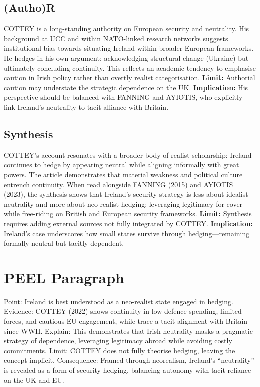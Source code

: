 \subsection*{(Autho)R}
COTTEY is a long-standing authority on European security and neutrality. His background at UCC and within NATO-linked research networks suggests institutional bias towards situating Ireland within broader European frameworks. He hedges in his own argument: acknowledging structural change (Ukraine) but ultimately concluding continuity. This reflects an academic tendency to emphasise caution in Irish policy rather than overtly realist categorisation.  
\textbf{Limit:} Authorial caution may understate the strategic dependence on the UK.  
\textbf{Implication:} His perspective should be balanced with FANNING and AYIOTIS, who explicitly link Ireland’s neutrality to tacit alliance with Britain.

\subsection*{Synthesis}
COTTEY’s account resonates with a broader body of realist scholarship: Ireland continues to hedge by appearing neutral while aligning informally with great powers. The article demonstrates that material weakness and political culture entrench continuity. When read alongside FANNING (2015) and AYIOTIS (2023), the synthesis shows that Ireland’s security strategy is less about idealist neutrality and more about neo-realist hedging: leveraging legitimacy for cover while free-riding on British and European security frameworks.  
\textbf{Limit:} Synthesis requires adding external sources not fully integrated by COTTEY.  
\textbf{Implication:} Ireland’s case underscores how small states survive through hedging—remaining formally neutral but tacitly dependent.

\section*{PEEL Paragraph}
Point: Ireland is best understood as a neo-realist state engaged in hedging.  
Evidence: COTTEY (2022) shows continuity in low defence spending, limited forces, and cautious EU engagement, while \parencite{FANNING_2015,AYIOTIS_2023} trace a tacit alignment with Britain since WWII.  
Explain: This demonstrates that Irish neutrality masks a pragmatic strategy of dependence, leveraging legitimacy abroad while avoiding costly commitments.  
Limit: COTTEY does not fully theorise hedging, leaving the concept implicit.  
Consequence: Framed through neorealism, Ireland’s “neutrality” is revealed as a form of security hedging, balancing autonomy with tacit reliance on the UK and EU.

